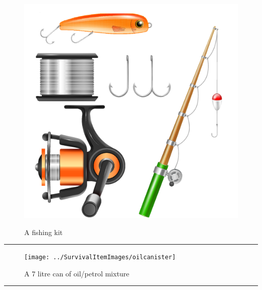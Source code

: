 \documentclass{article}
\begin{document}
    \begin{figure}[H]
        \centering
        \begin{minipage}{0.25\textwidth}
            \centering
            \includegraphics[width=\textwidth]{../SurvivalItemImages/fishingkit}
        \end{minipage}\hfill
        \begin{minipage}{0.7\textwidth}
            \centering
            \Large A fishing kit
        \end{minipage}
    \end{figure}
    \vspace{-0.8em}
    \noindent\rule{\textwidth}{0.4pt}
            
    \begin{figure}[H]
        \centering
        \begin{minipage}{0.25\textwidth}
            \centering
            \texttt{[image: ../SurvivalItemImages/oilcanister]}
        \end{minipage}\hfill
        \begin{minipage}{0.7\textwidth}
            \centering
            \Large A 7 litre can of oil/petrol mixture
        \end{minipage}
    \end{figure}
    \vspace{-0.8em}
    \noindent\rule{\textwidth}{0.4pt}
            
\end{document}
